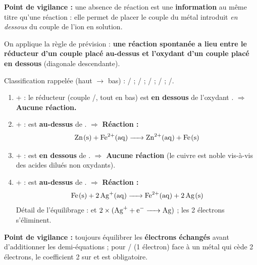 \documentclass[11pt]{article}
\begin{document}
\begin{corrige}
\begin{enumerate}
\end{enumerate}
\textbf{Point de vigilance :} une absence de réaction est une \textbf{information} au même titre qu'une réaction : elle permet de placer le couple du métal introduit \emph{en dessous} du couple de l'ion en solution.
\end{corrige}

\begin{corrige}
On applique la règle de prévision : \textbf{une réaction spontanée a lieu entre le réducteur d'un couple placé au-dessus et l'oxydant d'un couple placé en dessous} (diagonale descendante).

Classification rappelée (haut $\rightarrow$ bas) : / ; / ; / ; / ; /.

\begin{enumerate}
    \item {} +  : le réducteur  (couple /, tout en bas) est \textbf{en dessous} de l'oxydant . $\Rightarrow$ \textbf{Aucune réaction.}
    \item {} +  :  est \textbf{au-dessus} de . $\Rightarrow$ \textbf{Réaction :}
    \[ \ce{Zn(s) + Fe^2+(aq) -> Zn^2+(aq) + Fe(s)} \]
    \item {} +  :  est \textbf{en dessous} de . $\Rightarrow$ \textbf{Aucune réaction} (le cuivre est noble vis-à-vis des acides dilués non oxydants).
    \item {} +  :  est \textbf{au-dessus} de . $\Rightarrow$ \textbf{Réaction :}
    \[ \ce{Fe(s) + 2Ag+(aq) -> Fe^2+(aq) + 2Ag(s)} \]
    Détail de l'équilibrage :  et $2\times(\ce{Ag+ + e- -> Ag})$ ; les 2 électrons s'éliminent.
\end{enumerate}
\textbf{Point de vigilance :} toujours équilibrer les \textbf{électrons échangés} avant d'additionner les demi-équations ; pour / (1 électron) face à un métal qui cède 2 électrons, le coefficient 2 sur  et  est obligatoire.
\end{corrige}
\end{document}
